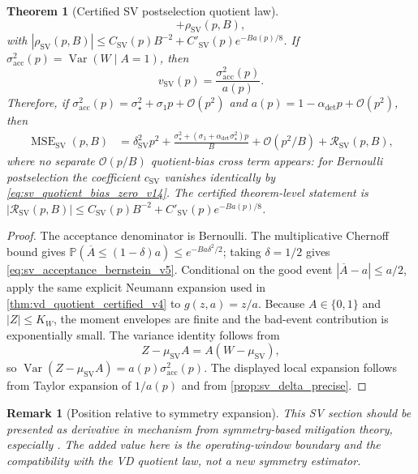 \documentclass[11pt]{article}
\newtheorem{theorem}{Theorem}
\newtheorem{remark}{Remark}
\newcommand{\MSE}{\operatorname{MSE}}
\newcommand{\Var}{\operatorname{Var}}
\newcommand{\Prob}{\mathbb{P}}
\newcommand{\1}{\mathbf{1}}
\newcommand{\OO}{\mathcal{O}}
\newcommand{\abs}[1]{\left\lvert #1 \right\rvert}
\begin{document}
\begin{theorem}[Certified SV postselection quotient law]
\begin{equation}
    +\rho_{\mathrm{SV}}(p,B),
    \label{eq:sv_certified_mse_v5}
\end{equation}
with \(\abs{\rho_{\mathrm{SV}}(p,B)}\le C_{\mathrm{SV}}(p)B^{-2}+C'_{\mathrm{SV}}(p)e^{-Ba(p)/8}\).  If \(\sigma_{\mathrm{acc}}^2(p)=\Var(W\mid A=1)\), then
\begin{equation}
    v_{\mathrm{SV}}(p)=\frac{\sigma_{\mathrm{acc}}^2(p)}{a(p)}.
\end{equation}
Therefore, if \(\sigma_{\mathrm{acc}}^2(p)=\sigma_\star^2+\sigma_1p+\OO(p^2)\) and \(a(p)=1-\alpha_{\mathrm{det}}p+\OO(p^2)\), then
\begin{align}
    \MSE_{\mathrm{SV}}(p,B)
    &=\delta_{\mathrm{SV}}^2p^2
    +\frac{\sigma_\star^2+(\sigma_1+\alpha_{\mathrm{det}}\sigma_\star^2)p}{B}
    +\OO(p^2/B)+\mathcal R_{\mathrm{SV}}(p,B),
\end{align}
where no separate \(\OO(p/B)\) quotient-bias cross term appears: for Bernoulli postselection the coefficient \(c_{\mathrm{SV}}\) vanishes identically by \cref{eq:sv_quotient_bias_zero_v14}.  The certified theorem-level statement is \(\abs{\mathcal R_{\mathrm{SV}}(p,B)}\le C_{\mathrm{SV}}(p)B^{-2}+C'_{\mathrm{SV}}(p)e^{-Ba(p)/8}\).
\end{theorem}

\begin{proof}
The acceptance denominator is Bernoulli.  The multiplicative Chernoff bound gives \(\Prob(\overline A\le (1-\delta)a)\le e^{-Ba\delta^2/2}\); taking \(\delta=1/2\) gives \cref{eq:sv_acceptance_bernstein_v5}.  Conditional on the good event \(\abs{\overline A-a}\le a/2\), apply the same explicit Neumann expansion used in \cref{thm:vd_quotient_certified_v4} to \(g(z,a)=z/a\).  Because \(A\in\{0,1\}\) and \(\abs Z\le K_W\), the moment envelopes are finite and the bad-event contribution is exponentially small.  The variance identity follows from
\begin{equation}
    Z-\mu_{\mathrm{SV}}A=A(W-\mu_{\mathrm{SV}}),
\end{equation}
so \(\Var(Z-\mu_{\mathrm{SV}}A)=a(p)\sigma_{\mathrm{acc}}^2(p)\).  The displayed local expansion follows from Taylor expansion of \(1/a(p)\) and from \cref{prop:sv_delta_precise}.
\end{proof}

\begin{remark}[Position relative to symmetry expansion]
This SV section should be presented as derivative in mechanism from symmetry-based mitigation theory, especially \citet{Cai2021}.  The added value here is the operating-window boundary and the compatibility with the VD quotient law, not a new symmetry estimator.
\end{remark}
\end{document}
